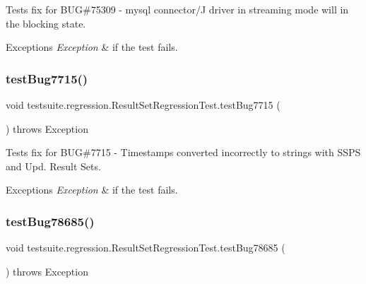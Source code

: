 Tests fix for B\+UG\#75309 -\/ mysql connector/J driver in streaming mode will in the blocking state.


\begin{DoxyExceptions}{Exceptions}
{\em Exception} & if the test fails. \\
\hline
\end{DoxyExceptions}
\mbox{\label{classtestsuite_1_1regression_1_1_result_set_regression_test_ad13bf1855a9ea26c44b830e577097a90}} 
\subsubsection{\texorpdfstring{test\+Bug7715()}{testBug7715()}}
{\footnotesize\ttfamily void testsuite.\+regression.\+Result\+Set\+Regression\+Test.\+test\+Bug7715 (\begin{DoxyParamCaption}{ }\end{DoxyParamCaption}) throws Exception}

Tests fix for B\+UG\#7715 -\/ Timestamps converted incorrectly to strings with S\+S\+PS and Upd. Result Sets.


\begin{DoxyExceptions}{Exceptions}
{\em Exception} & if the test fails. \\
\hline
\end{DoxyExceptions}
\mbox{\label{classtestsuite_1_1regression_1_1_result_set_regression_test_a438ea870d217dc3c5a0df443b040c99f}} 
\subsubsection{\texorpdfstring{test\+Bug78685()}{testBug78685()}}
{\footnotesize\ttfamily void testsuite.\+regression.\+Result\+Set\+Regression\+Test.\+test\+Bug78685 (\begin{DoxyParamCaption}{ }\end{DoxyParamCaption}) throws Exception}

